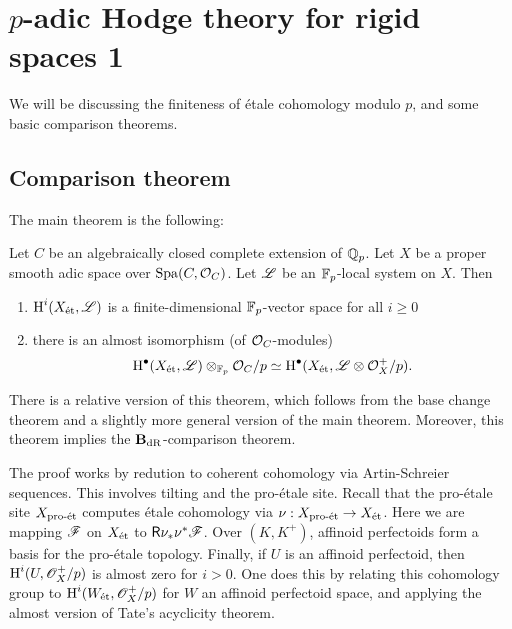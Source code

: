 
\section{\texorpdfstring{$p$}{p}-adic Hodge theory for rigid spaces 1}





We will be discussing the finiteness of \'etale cohomology modulo $p$, and some 
basic comparison theorems. 





\subsection{Comparison theorem}

The main theorem is the following:

\begin{theorem}\label{thm:main-comp-thm}
Let $C$ be an algebraically closed complete extension of $\mathbb{Q}_p$. Let $X$ be 
a proper smooth adic space over $\operatorname{Spa}(C,\mathcal{O}_C)$. Let $\mathscr{L}$ be an $\mathbb{F}_p$-local 
system on $X$. Then 
\begin{enumerate}
  \item $\operatorname{H}^i(X_{\textnormal{\'et}},\mathscr{L})$ is a finite-dimensional $\mathbb{F}_p$-vector space for all $i\geqslant 0$ 
  \item there is an almost isomorphism (of $\mathcal{O}_C$-modules) 
    \[
      \operatorname{H}^\bullet(X_{\textnormal{\'et}},\mathscr{L})\otimes_{\mathbb{F}_p} \mathcal{O}_C/p \simeq \operatorname{H}^\bullet(X_{\textnormal{\'et}},\mathscr{L}\otimes \mathcal{O}_X^+/p) .
    \]
\end{enumerate}
\end{theorem}

There is a relative version of this theorem, which follows from the base change theorem 
and a slightly more general version of the main theorem. Moreover, this theorem implies 
the $\mathbf{B}_\textnormal{dR}$-comparison theorem. 

The proof works by redution to coherent cohomology via Artin-Schreier sequences. This 
involves tilting and the pro-\'etale site. Recall that the pro-\'etale site $X_{\textnormal{pro-\'et}}$ 
computes \'etale cohomology via $\nu:X_{\textnormal{pro-\'et}} \to X_{\textnormal{\'et}}$. Here we are mapping 
$\mathscr{F}$ on $X_{\textnormal{\'et}}$ to $\mathsf R \nu_\ast \nu^\ast \mathscr{F}$. 
Over $(K,K^+)$, affinoid perfectoids form a basis for the pro-\'etale topology. 
Finally, if $U$ is an affinoid perfectoid, then $\operatorname{H}^i(U,\mathscr{O}_X^+/p)$ is almost 
zero for $i>0$. One does this by relating this cohomology group to 
$\operatorname{H}^i(W_{\textnormal{\'et}},\mathscr{O}_X^+/p)$ for $W$ an affinoid perfectoid space, and applying the 
almost version of Tate's acyclicity theorem. 

